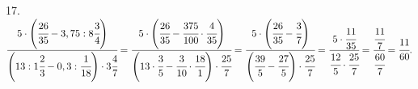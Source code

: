 17. $\cfrac{5\cdot\left(\cfrac{26}{35}-3,75:8\cfrac{3}{4}\right)}{\left(13:1\cfrac{2}{3}-0,3:\cfrac{1}{18}\right)\cdot3\cfrac{4}{7}}=
\cfrac{5\cdot\left(\cfrac{26}{35}-\cfrac{375}{100}\cdot\cfrac{4}{35}\right)}{\left(13\cdot\cfrac{3}{5}-\cfrac{3}{10}\cdot\cfrac{18}{1}\right)\cdot\cfrac{25}{7}}=
\cfrac{5\cdot\left(\cfrac{26}{35}-\cfrac{3}{7}\right)}{\left(\cfrac{39}{5}-\cfrac{27}{5}\right)\cdot\cfrac{25}{7}}=
\cfrac{5\cdot\cfrac{11}{35}}{\cfrac{12}{5}\cdot\cfrac{25}{7}}=\cfrac{\cfrac{11}{7}}{\cfrac{60}{7}}=\cfrac{11}{60}.$\\
